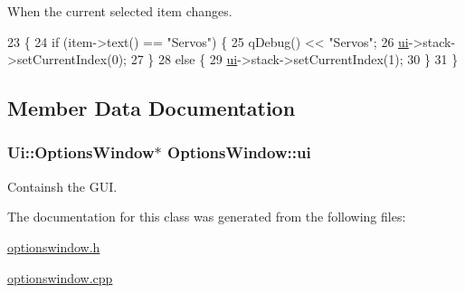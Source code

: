 When the current selected item changes. 


\begin{DoxyCode}
23 \{
24     \textcolor{keywordflow}{if} (item->text() == \textcolor{stringliteral}{"Servos"}) \{
25         qDebug() << \textcolor{stringliteral}{"Servos"};
26         \hyperlink{class_options_window_a8347442d5b3b670e8fff0c4102db1f88}{ui}->stack->setCurrentIndex(0);
27     \}
28     \textcolor{keywordflow}{else} \{
29         \hyperlink{class_options_window_a8347442d5b3b670e8fff0c4102db1f88}{ui}->stack->setCurrentIndex(1);
30     \}
31 \}
\end{DoxyCode}


\subsection{Member Data Documentation}
\hypertarget{class_options_window_a8347442d5b3b670e8fff0c4102db1f88}{}
\subsubsection[{ui}]{\setlength{\rightskip}{0pt plus 5cm}Ui\+::\+Options\+Window$\ast$ Options\+Window\+::ui\hspace{0.3cm}{\ttfamily [private]}}\label{class_options_window_a8347442d5b3b670e8fff0c4102db1f88}


Containsh the G\+U\+I. 



The documentation for this class was generated from the following files\+:\begin{DoxyCompactItemize}
\item 
\hyperlink{optionswindow_8h}{optionswindow.\+h}\item 
\hyperlink{optionswindow_8cpp}{optionswindow.\+cpp}\end{DoxyCompactItemize}
